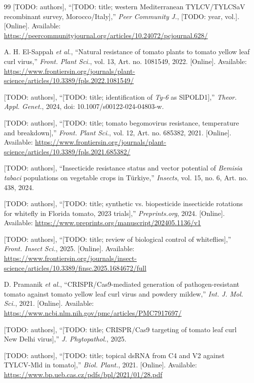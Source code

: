 \documentclass[journal]{IEEEtran}
\begin{document}
\begin{thebibliography}{99}
 [TODO: authors], ``[TODO: title; western Mediterranean TYLCV/TYLCSaV recombinant survey, Morocco/Italy],'' \textit{Peer Community J.}, [TODO: year, vol.]. [Online]. Available: \url{https://peercommunityjournal.org/articles/10.24072/pcjournal.628/}

 A. H. El-Sappah \textit{et al.}, ``Natural resistance of tomato plants to tomato yellow leaf curl virus,'' \textit{Front. Plant Sci.}, vol. 13, Art. no. 1081549, 2022. [Online]. Available: \url{https://www.frontiersin.org/journals/plant-science/articles/10.3389/fpls.2022.1081549/}

 [TODO: authors], ``[TODO: title; identification of \textit{Ty-6} as SlPOLD1],'' \textit{Theor. Appl. Genet.}, 2024, doi: 10.1007/s00122-024-04803-w.

 [TODO: authors], ``[TODO: title; tomato begomovirus resistance, temperature and breakdown],'' \textit{Front. Plant Sci.}, vol. 12, Art. no. 685382, 2021. [Online]. Available: \url{https://www.frontiersin.org/journals/plant-science/articles/10.3389/fpls.2021.685382/}

 [TODO: authors], ``Insecticide resistance status and vector potential of \textit{Bemisia tabaci} populations on vegetable crops in T\"urkiye,'' \textit{Insects}, vol. 15, no. 6, Art. no. 438, 2024.

 [TODO: authors], ``[TODO: title; synthetic vs. biopesticide insecticide rotations for whitefly in Florida tomato, 2023 trials],'' \textit{Preprints.org}, 2024. [Online]. Available: \url{https://www.preprints.org/manuscript/202405.1136/v1}

 [TODO: authors], ``[TODO: title; review of biological control of whiteflies],'' \textit{Front. Insect Sci.}, 2025. [Online]. Available: \url{https://www.frontiersin.org/journals/insect-science/articles/10.3389/finsc.2025.1684672/full}

 D. Pramanik \textit{et al.}, ``CRISPR/Cas9-mediated generation of pathogen-resistant tomato against tomato yellow leaf curl virus and powdery mildew,'' \textit{Int. J. Mol. Sci.}, 2021. [Online]. Available: \url{https://www.ncbi.nlm.nih.gov/pmc/articles/PMC7917697/} %

 [TODO: authors], ``[TODO: title; CRISPR/Cas9 targeting of tomato leaf curl New Delhi virus],'' \textit{J. Phytopathol.}, 2025.

 [TODO: authors], ``[TODO: title; topical dsRNA from C4 and V2 against TYLCV-Mld in tomato],'' \textit{Biol. Plant.}, 2021. [Online]. Available: \url{https://www.bp.ueb.cas.cz/pdfs/bpl/2021/01/28.pdf}


\end{thebibliography}
\end{document}

